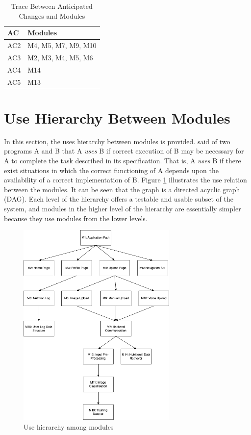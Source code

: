 \documentclass[12pt, titlepage]{article}
\begin{document}
\begin{table}[H]
\centering
\begin{tabular}{p{} p{}}
\toprule
\textbf{AC} & \textbf{Modules}\\
\midrule
AC2 & M4, M5, M7, M9, M10\\
AC3 & M2, M3, M4, M5, M6\\
AC4 & M14\\
AC5 & M13\\
\bottomrule
\end{tabular}
\caption{Trace Between Anticipated Changes and Modules}
\label{TblACT}
\end{table}

\section{Use Hierarchy Between Modules} \label{SecUse}

In this section, the uses hierarchy between modules is
provided. \citet{Parnas1978} said of two programs A and B that A {\em uses} B if
correct execution of B may be necessary for A to complete the task described in
its specification. That is, A {\em uses} B if there exist situations in which
the correct functioning of A depends upon the availability of a correct
implementation of B.  Figure \ref{FigUH} illustrates the use relation between
the modules. It can be seen that the graph is a directed acyclic graph
(DAG). Each level of the hierarchy offers a testable and usable subset of the
system, and modules in the higher level of the hierarchy are essentially simpler
because they use modules from the lower levels.

\begin{figure}[H]
\centering
\includegraphics[width=0.7\textwidth]{use_hierarchy.png}
\caption{Use hierarchy among modules}
\label{FigUH}
\end{figure}
\end{document}
